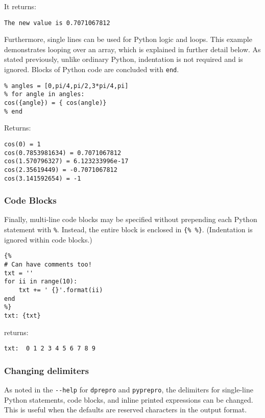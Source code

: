 It returns:

\begin{verbatim}
The new value is 0.7071067812
\end{verbatim}

Furthermore, single lines can be used for Python logic and loops. This example 
demonstrates looping over an array, which is explained in further detail below.
As stated previously, unlike ordinary Python, indentation is not required and is 
ignored. Blocks of Python code are concluded with \texttt{end}.

\begin{verbatim}
% angles = [0,pi/4,pi/2,3*pi/4,pi]
% for angle in angles:
cos({angle}) = { cos(angle)}
% end
\end{verbatim}

Returns:

\begin{verbatim}
cos(0) = 1
cos(0.7853981634) = 0.7071067812
cos(1.570796327) = 6.123233996e-17
cos(2.35619449) = -0.7071067812
cos(3.141592654) = -1
\end{verbatim}

\subsubsection{Code Blocks}\label{interfaces:code-blocks}

Finally, multi-line code blocks may be specified without prepending each 
Python statement with \texttt{\%}. Instead, the entire block is enclosed
in \texttt{\{\% \%\}}. (Indentation is ignored within code blocks.)

\begin{verbatim}
{%
# Can have comments too!
txt = ''
for ii in range(10):
    txt += ' {}'.format(ii)
end
%}
txt: {txt}
\end{verbatim}

returns:

\begin{verbatim}
txt:  0 1 2 3 4 5 6 7 8 9
\end{verbatim}

\subsubsection{Changing delimiters}\label{interfaces:changing-delimiters}

As noted in the \texttt{-\/-help} for \texttt{dprepro} and \texttt{pyprepro},
the delimiters for single-line Python statements, code blocks, and inline 
printed expressions can be changed. This is useful when the defaults are 
reserved characters in the output format.

